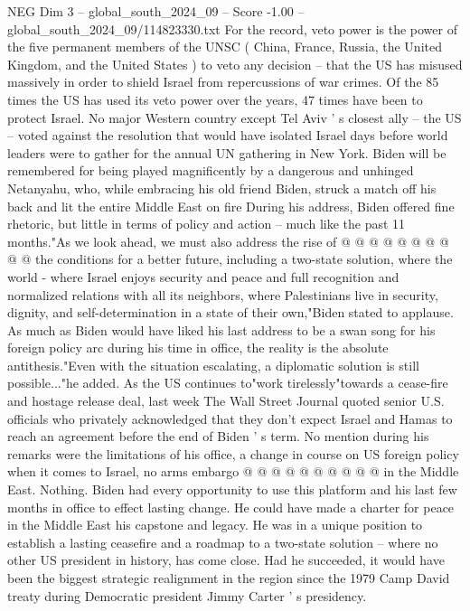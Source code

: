 \begin{textsample}{NEG Dim 3 – global\_south\_2024\_09 – Score -1.00 – global\_south\_2024\_09/114823330.txt}  \label{ex:f3_neg_125}
For the record, veto power is the power of the five permanent members of the UNSC ( China, France, Russia, the United Kingdom, and the United States ) to veto any decision -- that the US has misused massively in order to shield Israel from repercussions of war crimes.
Of the 85 times the US has used its veto power over the years, 47 times have been to protect Israel.
No major Western country except Tel Aviv ' s closest ally -- the US -- voted against the resolution that would have isolated Israel days before world leaders were to gather for the annual UN gathering in New York.
Biden will be remembered for being played magnificently by a dangerous and unhinged Netanyahu, who, while embracing his old friend Biden, struck a match off his back and lit the entire Middle East on fire During his address, Biden offered fine rhetoric, but little in terms of policy and action -- much like the past 11 months."As we look ahead, we must also address the rise of @ @ @ @ @ @ @ @ @ @ the conditions for a better future, including a two-state solution, where the world - where Israel enjoys security and peace and full recognition and normalized relations with all its neighbors, where Palestinians live in security, dignity, and self-determination in a state of their own,"Biden stated to applause.
As much as Biden would have liked his last address to be a swan song for his foreign policy arc during his time in office, the reality is the absolute antithesis."Even with the situation escalating, a diplomatic solution is still possible..."he added.
As the US continues to"work tirelessly"towards a cease-fire and hostage release deal, last week The Wall Street Journal quoted senior U.S. officials who privately acknowledged that they don't expect Israel and Hamas to reach an agreement before the end of Biden ' s term.
No mention during his remarks were the limitations of his office, a change in course on US foreign policy when it comes to Israel, no arms embargo @ @ @ @ @ @ @ @ @ @ in the Middle East.
Nothing.
Biden had every opportunity to use this platform and his last few months in office to effect lasting change.
He could have made a charter for peace in the Middle East his capstone and legacy.
He was in a unique position to establish a lasting ceasefire and a roadmap to a two-state solution -- where no other US president in history, has come close.
Had he succeeded, it would have been the biggest strategic realignment in the region since the 1979 Camp David treaty during Democratic president Jimmy Carter ' s presidency.

\end{textsample}
